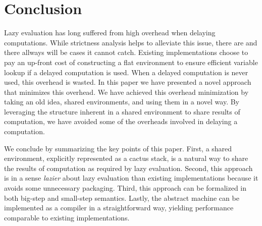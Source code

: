\section{Conclusion} \label{sec:conc}

Lazy evaluation has long suffered from high overhead when delaying computations.
While strictness analysis helps to alleviate this issue, there are and there
allways will be cases it cannot catch. Existing implementations choose to pay an
up-front cost of constructing a flat environment to ensure efficient variable
lookup if a delayed computation is used. When a delayed computation is never
used, this overhead is wasted. In this paper we have presented a novel approach
that minimizes this overhead. We have achieved this overhead minimization by
taking an old idea, shared environments, and using them in a novel way. By
leveraging the structure inherent in a shared environment to share results of
computation, we have avoided some of the overheads involved in delaying a
computation. 

We conclude by summarizing the key points of this paper. First, a shared
environment, explicitly represented as a cactus stack, is a natural way to share
the results of computation as required by lazy evaluation. Second, this approach
is in a sense \emph{lazier} about lazy evaluation than existing implementations
because it avoids some unnecessary packaging. Third, this approach can be
formalized in both big-step and small-step semantics. Lastly, the abstract
machine can be implemented as a compiler in a straightforward way, yielding
performance comparable to existing implementations. 
